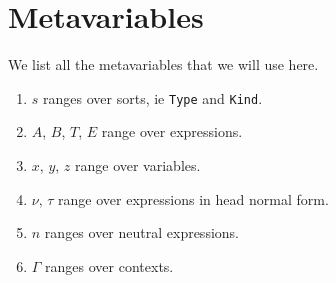 \documentclass{article}
\begin{document}
\begin{comment}
Noting that lines beginning with \verb|--| are treated as comments and 
using syntactic sugar borrowed from the Lean theorem prover, we may rewrite this
as
\begin{verbatim}
theorem or_comm :
forall (P : Prop) (Q : Prop), (P \/ Q) -> Q \/ P :=
-- Assume that P and Q are propositions and that p_or_q 
-- is a proof that P \/ Q.
  assume P Q (p_or_q : P \/ Q),
    -- We proceed by considering cases on P \/ Q.
    match p_or_q with
    -- In the event where P is true, ie p is a proof of P,
    -- we may immediate conclude Q \/ P is true since 
    -- (inr p) is a proof of it.
    | inl p => show Q \/ P, from inr p
    -- In the event where Q is true, ie q is a proof of Q,
    -- we use (inl q) to show Q \/ P. 
    | inr q => show Q \/ P, from inl q
    end
\end{verbatim}
which may read more naturally to those who are more mathematically inclined.
\end{comment}




\section{Metavariables}
We list all the metavariables that we will use here.

\begin{enumerate}
  \item $s$ ranges over sorts, ie \verb|Type| and \verb|Kind|. 
  \item $A$, $B$, $T$, $E$ range over expressions. 
  \item $x$, $y$, $z$ range over variables.
  \item $\nu, \, \tau$ range over expressions in head normal form.
  \item $n$ ranges over neutral expressions.
  \item $\Gamma$ ranges over contexts.
\end{enumerate}
\end{document}
